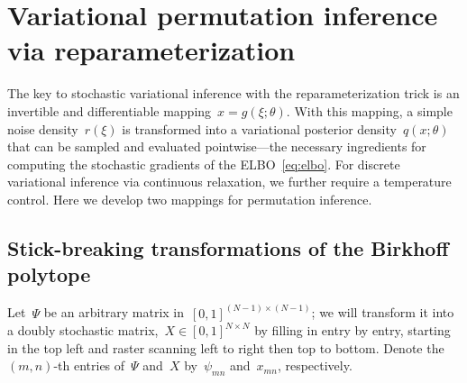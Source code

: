 \documentclass[twoside]{article}
\begin{document}
\section{Variational permutation inference via reparameterization}
\label{sec:permutation}

The key to stochastic variational inference with the reparameterization
trick is an invertible and differentiable mapping~$x=g(\xi; \theta)$.
With this mapping, a simple noise density~$r(\xi)$ is transformed
into a variational posterior density~$q(x; \theta)$ that can be
sampled and evaluated pointwise---the necessary ingredients for
computing the stochastic gradients of the ELBO~\eqref{eq:elbo}.
For discrete variational inference via continuous relaxation,
we further require a temperature control.  Here we develop two
mappings for permutation inference.

\subsection{Stick-breaking transformations of the Birkhoff polytope}
Let~$\Psi$ be an arbitrary matrix in~${[0,1]^{(N-1) \times (N-1)}}$; we will
transform it into a doubly stochastic
matrix,~$X \in [0,1]^{N \times N}$ by filling in entry by entry, starting
in the top left and raster scanning left to right then top to
bottom. Denote the~$(m,n)$-th entries of~$\Psi$ and~$X$ by~$\psi_{mn}$
and~${x}_{mn}$, respectively.
\end{document}
